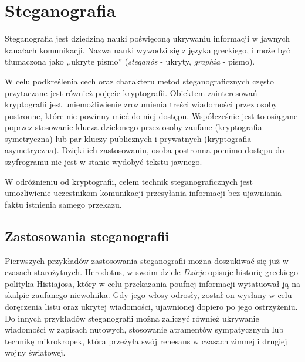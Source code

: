 
\chapter{Steganografia}\label{chap:steganography}
{

    Steganografia jest dziedziną nauki poświęconą ukrywaniu informacji w jawnych kanałach komunikacji. Nazwa nauki
    wywodzi się z języka greckiego, i może być tłumaczona jako ,,ukryte pismo'' (\textit{steganós} - ukryty,
    \textit{graphia} - pismo).

    W celu podkreślenia cech oraz charakteru metod steganograficznych często przytaczane jest również pojęcie
    kryptografii. Obiektem zainteresowań kryptografii jest uniemożliwienie zrozumienia treści wiadomości przez osoby
    postronne, które nie powinny mieć do niej dostępu. Współcześnie jest to osiągane poprzez stosowanie klucza
    dzielonego przez osoby zaufane (kryptografia symetryczna) lub par kluczy publicznych i prywatnych (kryptografia
    asymetryczna). Dzięki ich zastosowaniu, osoba postronna pomimo dostępu do szyfrogramu nie jest w stanie wydobyć
    tekstu jawnego.

    W odróżnieniu od kryptografii, celem technik steganograficznych jest umożliwienie uczestnikom komunikacji
    przesyłania informacji bez ujawniania faktu istnienia samego przekazu.

    \section{Zastosowania steganografii}
    {
        Pierwszych przykładów zastosowania steganografii można doszukiwać się już w czasach
        starożytnych\cite{Petitcolas1999InformationHS}. Herodotus, w swoim dziele \textit{Dzieje} opisuje historię
        greckiego polityka Histiajosa, który w celu przekazania poufnej informacji wytatuował ją na skalpie zaufanego
        niewolnika. Gdy jego włosy odrosły, został on wysłany w celu doręczenia listu oraz ukrytej wiadomości,
        ujawnionej dopiero po jego ostrzyżeniu. Do innych
        przykładów steganografii można zaliczyć również ukrywanie wiadomości w zapisach nutowych, stosowanie atramentów
        sympatycznych lub technikę mikrokropek\cite{Petitcolas1999InformationHS}, która przeżyła swój renesans w czasach
        zimnej i drugiej wojny światowej.

}}
